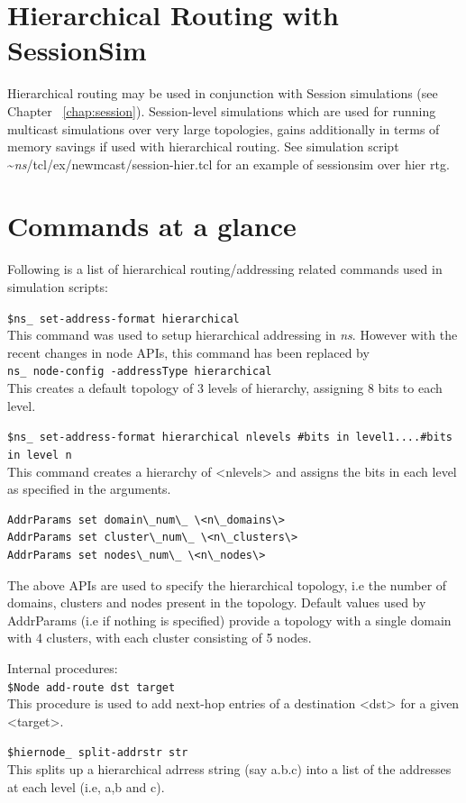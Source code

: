 \section{Hierarchical Routing with SessionSim}
\label{sec:hier-rtg-with-sessionsim}

Hierarchical routing may be used in conjunction with Session simulations
(see Chapter ~\ref{chap:session}). Session-level simulations which are used
for running multicast simulations over very large topologies, gains
additionally in terms of memory savings if used with hierarchical
routing. See simulation script \textasciitilde\emph{ns}/{tcl/ex/newmcast/session-hier.tcl}
for an example of sessionsim over hier rtg.


\section{Commands at a glance}

Following is a list of hierarchical routing/addressing related commands
used in simulation scripts:
\begin{flushleft}
{\tt \$ns\_ set-address-format hierarchical}\\
This command was used to setup hierarchical addressing in \emph{ns}. However with
the recent changes in node APIs, this command has been replaced by\\
{\tt ns\_ node-config -addressType hierarchical}\\
This creates a default topology of 3 levels of hierarchy, assigning 8 bits
to each level.


{\tt \$ns\_ set-address-format hierarchical \<nlevels\> \<#bits in level1\>....\<#bits in level n\>}\\
This command creates a hierarchy of <nlevels> and assigns the bits in each level
as specified in the arguments.


\begin{verbatim}
AddrParams set domain\_num\_ \<n\_domains\>
AddrParams set cluster\_num\_ \<n\_clusters\>
AddrParams set nodes\_num\_ \<n\_nodes\>
\end{verbatim}
The above APIs are used to specify the hierarchical topology, i.e the number of
domains, clusters and nodes present in the topology. Default values used by
AddrParams (i.e if nothing is specified) provide a topology with a single
domain with 4 clusters, with each cluster consisting of 5 nodes.


Internal procedures:\\

{\tt \$Node add-route \<dst\> \<target\>}\\
This procedure is used to add next-hop entries of a destination <dst> for a given <target>. 


{\tt \$hiernode\_ split-addrstr \<str\>}\\
This splits up a hierarchical adrress string  (say a.b.c) into a list of
the addresses at each level (i.e, a,b and c).

\end{flushleft}

\endinput
